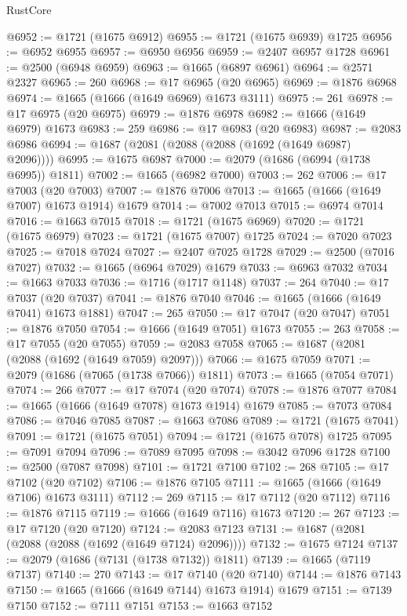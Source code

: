 \begin{lexlean}{RustCore}
\begin{coremodule}
@6952 := @1721 (@1675 @6912)
@6955 := @1721 (@1675 @6939) @1725
@6956 := @6952 @6955
@6957 := @6950 @6956
@6959 := @2407 @6957 @1728
@6961 := @2500 (@6948 @6959)
@6963 := @1665 (@6897 @6961)
@6964 := @2571 @2327
@6965 := 260
@6968 := @17 @6965 (@20 @6965)
@6969 := @1876 @6968
@6974 := @1665 (@1666 (@1649 @6969) @1673 @3111)
@6975 := 261
@6978 := @17 @6975 (@20 @6975)
@6979 := @1876 @6978
@6982 := @1666 (@1649 @6979) @1673
@6983 := 259
@6986 := @17 @6983 (@20 @6983)
@6987 := @2083 @6986
@6994 := @1687 (@2081 (@2088 (@2088 (@1692 (@1649 @6987) @2096))))
@6995 := @1675 @6987
@7000 := @2079 (@1686 (@6994 (@1738 @6995)) @1811)
@7002 := @1665 (@6982 @7000)
@7003 := 262
@7006 := @17 @7003 (@20 @7003)
@7007 := @1876 @7006
@7013 := @1665 (@1666 (@1649 @7007) @1673 @1914) @1679
@7014 := @7002 @7013
@7015 := @6974 @7014
@7016 := @1663 @7015
@7018 := @1721 (@1675 @6969)
@7020 := @1721 (@1675 @6979)
@7023 := @1721 (@1675 @7007) @1725
@7024 := @7020 @7023
@7025 := @7018 @7024
@7027 := @2407 @7025 @1728
@7029 := @2500 (@7016 @7027)
@7032 := @1665 (@6964 @7029) @1679
@7033 := @6963 @7032
@7034 := @1663 @7033
@7036 := @1716 (@1717 @1148)
@7037 := 264
@7040 := @17 @7037 (@20 @7037)
@7041 := @1876 @7040
@7046 := @1665 (@1666 (@1649 @7041) @1673 @1881)
@7047 := 265
@7050 := @17 @7047 (@20 @7047)
@7051 := @1876 @7050
@7054 := @1666 (@1649 @7051) @1673
@7055 := 263
@7058 := @17 @7055 (@20 @7055)
@7059 := @2083 @7058
@7065 := @1687 (@2081 (@2088 (@1692 (@1649 @7059) @2097)))
@7066 := @1675 @7059
@7071 := @2079 (@1686 (@7065 (@1738 @7066)) @1811)
@7073 := @1665 (@7054 @7071)
@7074 := 266
@7077 := @17 @7074 (@20 @7074)
@7078 := @1876 @7077
@7084 := @1665 (@1666 (@1649 @7078) @1673 @1914) @1679
@7085 := @7073 @7084
@7086 := @7046 @7085
@7087 := @1663 @7086
@7089 := @1721 (@1675 @7041)
@7091 := @1721 (@1675 @7051)
@7094 := @1721 (@1675 @7078) @1725
@7095 := @7091 @7094
@7096 := @7089 @7095
@7098 := @3042 @7096 @1728
@7100 := @2500 (@7087 @7098)
@7101 := @1721 @7100
@7102 := 268
@7105 := @17 @7102 (@20 @7102)
@7106 := @1876 @7105
@7111 := @1665 (@1666 (@1649 @7106) @1673 @3111)
@7112 := 269
@7115 := @17 @7112 (@20 @7112)
@7116 := @1876 @7115
@7119 := @1666 (@1649 @7116) @1673
@7120 := 267
@7123 := @17 @7120 (@20 @7120)
@7124 := @2083 @7123
@7131 := @1687 (@2081 (@2088 (@2088 (@1692 (@1649 @7124) @2096))))
@7132 := @1675 @7124
@7137 := @2079 (@1686 (@7131 (@1738 @7132)) @1811)
@7139 := @1665 (@7119 @7137)
@7140 := 270
@7143 := @17 @7140 (@20 @7140)
@7144 := @1876 @7143
@7150 := @1665 (@1666 (@1649 @7144) @1673 @1914) @1679
@7151 := @7139 @7150
@7152 := @7111 @7151
@7153 := @1663 @7152

\end{coremodule}
\end{lexlean}
